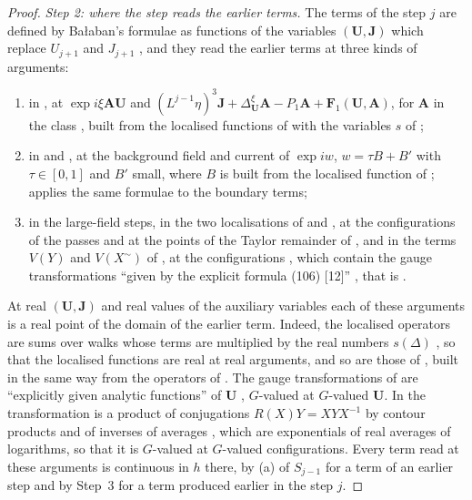 \documentclass[11pt]{preprint}
\numberwithin{equation}{section}
\theoremstyle{definition}
\theoremstyle{remark}
\theoremstyle{plain}
\begin{document}
\begin{proof}
\emph{Step 2: where the step reads the earlier terms.} The terms of the step $j$ are defined by Ba{\l}aban's formulae as functions of the variables $(\mathbf U, \mathbf J)$ which replace $U_{j+1}$ and $J_{j+1}$ \cite[p.~272]{BalabanRG1}, and they read the earlier terms at three kinds of arguments:
\begin{enumerate}[label=(\roman*)]
\item in \cite[(3.13), p.~272]{BalabanRG1}, at $\exp i\xi\mathbf A\mathbf U$ and $(L^{j-1}\eta)^3\mathbf J + \Delta^\xi_{\mathbf U}\mathbf A - P_1\mathbf A + \mathbf F_1(\mathbf U, \mathbf A)$, for $\mathbf A$ in the class \cite[(3.14)]{BalabanRG1}, built from the localised functions of \cite[p.~273]{BalabanRG1} with the variables $s$ of \cite[p.~8]{BalabanRG2};
\item in \cite[(3.33)--(3.36), p.~277]{BalabanRG1} and \cite[(3.53), p.~280]{BalabanRG1}, at the background field and current of $\exp iw$, $w = \tau B + B'$ with $\tau \in [0, 1]$ and $B'$ small, where $B$ is built from the localised function of \cite[(1.8), p.~3]{BalabanRG2}; \cite[p.~276]{BalabanCRE} applies the same formulae to the boundary terms;
\item in the large-field steps, in the two localisations of \cite[(1.59)--(1.60), p.~372]{BalabanLFR2} and \cite[pp.~373--379]{BalabanLFR2}, at the configurations of the passes and at the points of the Taylor remainder of \cite[(3.34)]{BalabanRG1}, and in the terms $V(Y)$ and $V(X^\sim)$ of \cite[(1.70)--(1.72), pp.~377--379]{BalabanLFR2}, at the configurations \cite[(1.61)--(1.65), pp.~373--375]{BalabanLFR2}, which contain the gauge transformations ``given by the explicit formula (106) [12]'' \cite[p.~373]{BalabanLFR2}, that is \cite[(106), p.~33]{BalabanCMP98}.
\end{enumerate}
At real $(\mathbf U, \mathbf J)$ and real values of the auxiliary variables each of these arguments is a real point of the domain of the earlier term. Indeed, the localised operators are sums over walks whose terms are multiplied by the real numbers $s(\Delta)$ \cite[p.~3]{BalabanRG2}, so that the localised functions are real at real arguments, and so are those of \cite[(1.54), (1.57), (1.58), pp.~370--371]{BalabanLFR2}, built in the same way from the operators of \cite{BalabanPBG,BalabanVAR}. The gauge transformations of \cite[(3.26)--(3.27), p.~275]{BalabanRG1} are ``explicitly given analytic functions'' of $\mathbf U$ \cite[p.~276]{BalabanRG1}, $G$-valued at $G$-valued $\mathbf U$. In \cite[(106), p.~33]{BalabanCMP98} the transformation is a product of conjugations $R(X)Y = XYX^{-1}$ \cite[(56), p.~27]{BalabanCMP98} by contour products and of inverses of averages \cite[(105)]{BalabanCMP98}, which are exponentials of real averages of logarithms, so that it is $G$-valued at $G$-valued configurations. Every term read at these arguments is continuous in $h$ there, by (a) of $S_{j-1}$ for a term of an earlier step and by Step~3 for a term produced earlier in the step $j$.


\end{proof}
\end{document}
